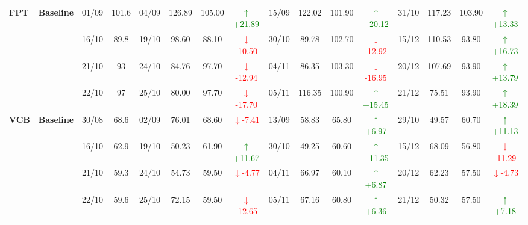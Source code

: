 \documentclass{ieeeaccess}
\begin{document}
{\begin{longtable}{llcc|cccc|cccc|cccc}
\multirow{4}{*}{\textbf{FPT}}
& \textbf{Baseline}
& 01/09 & 101.6 & 04/09 & 126.89 & 105.00 & \textcolor{green}{\(\uparrow\)+21.89} & 15/09 & 122.02 & 101.90 & \textcolor{green}{\(\uparrow\)+20.12} & 31/10 & 117.23 & 103.90 & \textcolor{green}{\(\uparrow\)+13.33} \\
& & 16/10 & 89.8 & 19/10 & 98.60 & 88.10 & \textcolor{red}{\(\downarrow\)-10.50} & 30/10 & 89.78 & 102.70 & \textcolor{red}{\(\downarrow\)-12.92} & 15/12 & 110.53 & 93.80 & \textcolor{green}{\(\uparrow\)+16.73} \\
& & 21/10 & 93 & 24/10 & 84.76 & 97.70 & \textcolor{red}{\(\downarrow\)-12.94} & 04/11 & 86.35 & 103.30 & \textcolor{red}{\(\downarrow\)-16.95} & 20/12 & 107.69 & 93.90 & \textcolor{green}{\(\uparrow\)+13.79} \\
& & 22/10 & 97 & 25/10 & 80.00 & 97.70 & \textcolor{red}{\(\downarrow\)-17.70} & 05/11 & 116.35 & 100.90 & \textcolor{green}{\(\uparrow\)+15.45} & 21/12 & 75.51 & 93.90 & \textcolor{green}{\(\uparrow\)+18.39} \\
\midrule

\multirow{4}{*}{\textbf{VCB}}
& \textbf{Baseline}
& 30/08 & 68.6 & 02/09 & 76.01 & 68.60 & \textcolor{red}{\(\downarrow\)-7.41} & 13/09 & 58.83 & 65.80 & \textcolor{green}{\(\uparrow\)+6.97} & 29/10 & 49.57 & 60.70 & \textcolor{green}{\(\uparrow\)+11.13} \\
& & 16/10 & 62.9 & 19/10 & 50.23 & 61.90 & \textcolor{green}{\(\uparrow\)+11.67} & 30/10 & 49.25 & 60.60 & \textcolor{green}{\(\uparrow\)+11.35} & 15/12 & 68.09 & 56.80 & \textcolor{red}{\(\downarrow\)-11.29} \\
& & 21/10 & 59.3 & 24/10 & 54.73 & 59.50 & \textcolor{red}{\(\downarrow\)-4.77} & 04/11 & 66.97 & 60.10 & \textcolor{green}{\(\uparrow\)+6.87} & 20/12 & 62.23 & 57.50 & \textcolor{red}{\(\downarrow\)-4.73} \\
& & 22/10 & 59.6 & 25/10 & 72.15 & 59.50 & \textcolor{red}{\(\downarrow\)-12.65} & 05/11 & 67.16 & 60.80 & \textcolor{green}{\(\uparrow\)+6.36} & 21/12 & 50.32 & 57.50 & \textcolor{green}{\(\uparrow\)+7.18} \\
\midrule


\end{longtable}}
\end{document}
